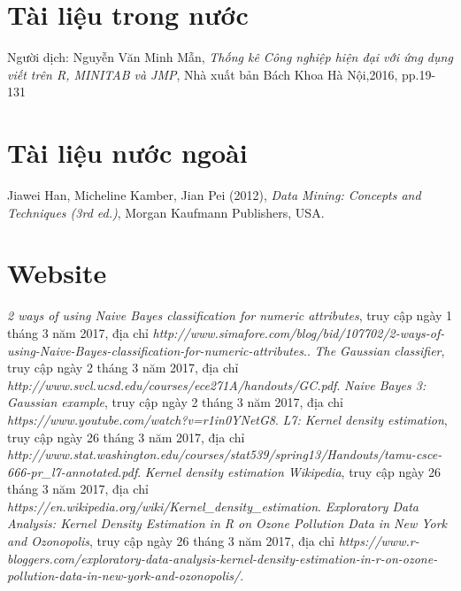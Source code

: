 \documentclass[a4paper, 13pt]{report}
\begin{document}
\cleardoublepage
{}
\begin{thebibliography}{9}
\section*{Tài liệu trong nước}
	Người dịch: Nguyễn Văn Minh Mẫn, 
	\emph{Thống kê Công nghiệp hiện đại với ứng dụng viết trên R, MINITAB và JMP},
	Nhà xuất bản Bách Khoa Hà Nội,2016, pp.19-131
\section*{Tài liệu nước ngoài}
	Jiawei Han, Micheline Kamber, Jian Pei (2012),
	\emph{Data Mining: Concepts and Techniques (3rd ed.)},
	Morgan Kaufmann Publishers, USA.
\section*{Website}
	\emph{2 ways of using Naive Bayes classification for numeric attributes}, truy cập ngày 1 tháng 3 năm 2017,
	địa chỉ \emph{http://www.simafore.com/blog/bid/107702/2-ways-of-using-Naive-Bayes-classification-for-numeric-attributes}..
	\emph{The Gaussian classifier}, truy cập ngày 2 tháng 3 năm 2017,
	địa chỉ \emph{http://www.svcl.ucsd.edu/courses/ece271A/handouts/GC.pdf}.
	\emph{Naive Bayes 3: Gaussian example}, truy cập ngày 2 tháng 3 năm 2017,
	địa chỉ \emph{https://www.youtube.com/watch?v=r1in0YNetG8}.	
	\emph{L7: Kernel density estimation}, truy cập ngày 26 tháng 3 năm 2017,
	địa chỉ \emph{http://www.stat.washington.edu/courses/stat539/spring13/Handouts/tamu-csce-666-pr\_l7-annotated.pdf}.	
	\emph{Kernel density estimation Wikipedia}, truy cập ngày 26 tháng 3 năm 2017,
	địa chỉ \emph{https://en.wikipedia.org/wiki/Kernel\_density\_estimation}.
	\emph{Exploratory Data Analysis: Kernel Density Estimation in R on Ozone Pollution Data in New York and Ozonopolis}, truy cập ngày 26 tháng 3 năm 2017,
	địa chỉ \emph{https://www.r-bloggers.com/exploratory-data-analysis-kernel-density-estimation-in-r-on-ozone-pollution-data-in-new-york-and-ozonopolis/}.

\end{thebibliography}
\end{document}
